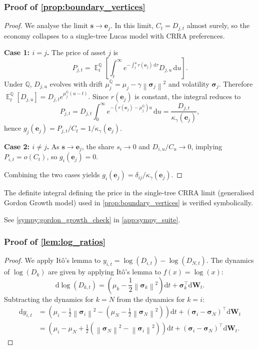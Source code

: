 \documentclass[11pt,letterpaper,oneside]{article}
\numberwithin{equation}{section}
\DeclareMathOperator{\E}{\mathbb{E}}
\newcommand{\1}{\mathbf{1}}
\newcommand{\diff}{\mathrm{d}}
\newcommand{\norm}[1]{\left\lVert #1\right\rVert}
\begin{document}
\subsubsection{Proof of \cref{prop:boundary_vertices}}\label{app:proof:prop:boundary_vertices}
\begin{proof}
We analyse the limit $\bm{s} \to \bm{e}_j$. In this limit, $C_t = D_{j,t}$ almost surely, so the economy collapses to a single-tree Lucas model with CRRA preferences.

\textbf{Case 1: $i=j$.} The price of asset $j$ is
\[
  P_{j,t} = \E_t^{\mathbb{Q}}\left[\int_t^\infty e^{-\int_t^u r(\bm{e}_j)\,\diff \tau} D_{j,u}\,\diff u\right].
\]
Under $\mathbb{Q}$, $D_{j,u}$ evolves with drift $\mu_j^{\mathbb{Q}} = \mu_j - \gamma\norm{\bm{\sigma}_j}^2$ and volatility $\bm{\sigma}_j$. Therefore $\E_t^{\mathbb{Q}}[D_{j,u}] = D_{j,t} e^{\mu_j^{\mathbb{Q}}(u-t)}$. Since $r(\bm{e}_j)$ is constant, the integral reduces to
\[
  P_{j,t} = D_{j,t} \int_0^\infty e^{-(r(\bm{e}_j)-\mu_j^{\mathbb{Q}})u}\,\diff u = \frac{D_{j,t}}{\kappa_\gamma(\bm{e}_j)},
\]
hence $g_j(\bm{e}_j) = P_{j,t}/C_t = 1/\kappa_\gamma(\bm{e}_j)$.

  	\textbf{Case 2: $i\neq j$.} As $\bm{s} \to \bm{e}_j$, the share $s_i \to 0$ and $D_{i,u}/C_u \to 0$, implying $P_{i,t} = o(C_t)$, so $g_i(\bm{e}_j)=0$.

Combining the two cases yields $g_i(\bm{e}_j) = \delta_{ij}/\kappa_\gamma(\bm{e}_j)$.
\end{proof}

\begin{sympycheck}[title={Verification: Gordon growth integral for CRRA preferences}]\label{sympy:gordon_growth}
The definite integral defining the price in the single-tree CRRA limit (generalised Gordon Growth model) used in \cref{prop:boundary_vertices} is verified symbolically.

See \cref{sympy:gordon_growth_check} in \cref{app:sympy_suite}.\end{sympycheck}


\subsubsection{Proof of \cref{lem:log_ratios}}\label{app:proof:lem:log_ratios}
\begin{proof}
We apply It\^o's lemma to $y_{i,t} = \log(D_{i,t}) - \log(D_{N,t})$.
The dynamics of $\log(D_k)$ are given by applying It\^o's lemma to $f(x)=\log(x)$:
\[
    \diff \log(D_{k,t}) = \left(\mu_k - \frac{1}{2}
\norm{\bm{\sigma}_k}^2\right)\diff t + \bm{\sigma}_k^{\top}\diff\bm{W}_t.
\]
Subtracting the dynamics for $k=N$ from the dynamics for $k=i$:
\begin{align}
    \diff y_{i,t} &= \left(\mu_i - \frac{1}{2}
\norm{\bm{\sigma}_i}^2 - \left(\mu_N - \frac{1}{2}
\norm{\bm{\sigma}_N}^2\right)\right)\diff t + (\bm{\sigma}_i - \bm{\sigma}_N)^{\top}\diff\bm{W}_t \\
    &= \left(\mu_i - \mu_N + \frac{1}{2}(
\norm{\bm{\sigma}_N}^2 - 
\norm{\bm{\sigma}_i}^2)\right)\diff t + (\bm{\sigma}_i - \bm{\sigma}_N)^{\top}\diff\bm{W}_t.
\end{align}
\end{proof}
\end{document}
